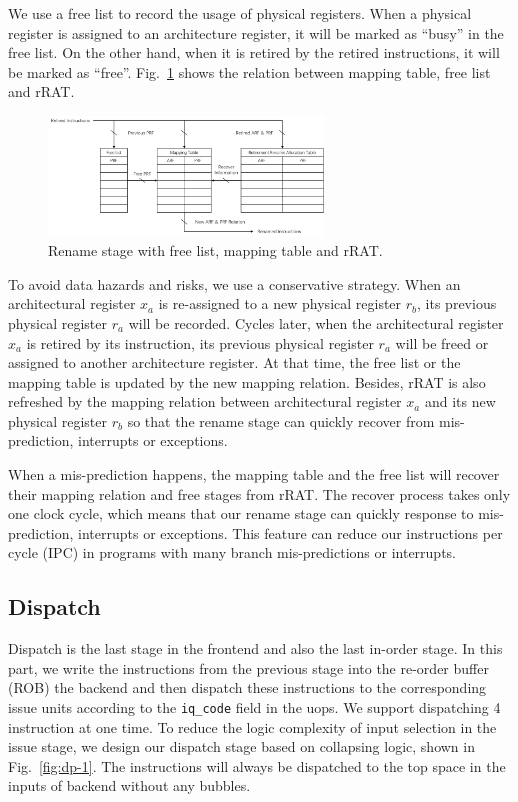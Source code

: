 We use a free list to record the usage of physical registers. When a physical register is assigned to an architecture register, it will be marked as ``busy'' in the free list. On the other hand, when it is retired by the retired instructions, it will be marked as ``free''. Fig.~\ref{fig:mapping} shows the relation between mapping table, free list and rRAT.

\begin{figure}[!htp]
    \centering
    \includegraphics[width=0.65\textwidth]{figure/map_rename.png}
    \caption{Rename stage with free list, mapping table and rRAT.}
    \label{fig:mapping}
\end{figure}

To avoid data hazards and risks, we use a conservative strategy. When an architectural register $x_a$ is re-assigned to a new physical register $r_b$, its previous physical register $r_a$ will be recorded. Cycles later, when the architectural register $x_a$ is retired by its instruction, its previous physical register $r_a$ will be freed or assigned to another architecture register. At that time, the free list or the mapping table is updated by the new mapping relation. Besides, rRAT is also refreshed by the mapping relation between architectural register $x_a$ and its new physical register $r_b$ so that the rename stage can quickly recover from mis-prediction, interrupts or exceptions.

When a mis-prediction happens, the mapping table and the free list will recover their mapping relation and free stages from rRAT. The recover process takes only one clock cycle, which means that our rename stage can quickly response to mis-prediction, interrupts or exceptions. This feature can reduce our instructions per cycle (IPC) in programs with many branch mis-predictions or interrupts.

\subsection{Dispatch} %

Dispatch is the last stage in the frontend and also the last in-order stage. In this part, we write the instructions from the previous stage into the re-order buffer (ROB) the backend and then dispatch these instructions to the corresponding issue units according to the \texttt{iq\_code} field in the uops. We support dispatching 4 instruction at one time. To reduce the logic complexity of input selection in the issue stage, we design our dispatch stage based on collapsing logic, shown in Fig.~\ref{fig:dp-1}. The instructions will always be dispatched to the top space in the inputs of backend without any bubbles.

